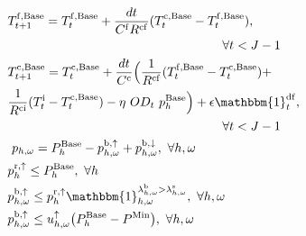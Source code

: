 {\begin{subequations}
\begin{align}
%
& T^{\rm{f},\text{Base}}_{t+1} = T^{\rm{f},\text{Base}}_{t} +   \frac{dt}{C^{\rm{f}}R^{\rm{cf}}} (T^{\rm{c},\text{Base}}_{t} - T^{\rm{f},\text{Base}}_{t}), \notag \\ & \hspace{6cm}\forall{t<J-1} \label{P2:state-space-3}                                                                                         \\
& T^{\rm{c},\text{Base}}_{t+1} = T^{\rm{c},\text{Base}}_t +   \frac{dt}{C^{\rm{c}}}\Bigl(\frac{1}{R^{\rm{cf}}} (T^{\rm{f},\text{Base}}_t - T^{\rm{c},\text{Base}}_t) + \notag \\ & \frac{1}{R^{\rm{ci}}} (T^{\rm{i}}_t - T^{\rm{c},\text{Base}}_t) - \eta  \  OD_t \ p_{h}^{\text{Base}} \Bigr) + \epsilon \mathbbm{1}^{\rm{df}}_{t}, \notag \\ & \hspace{6cm} \forall{t<J-1} \label{P2:state-space-4} \\
%
& \ p_{h,\omega} = P^{\rm{Base}}_{h} - p^{\rm{b}, \uparrow}_{h,\omega} + p^{\rm{b}, \downarrow}_{h,\omega}, \                                                                                                  \forall{h,\omega}                                                                             \label{power:6}                                                        \\
        \                                                                                             & p^{\rm{r}, \uparrow}_h \leq P^{\rm{Base}}_h,
        \                                                                                                                                                        \forall{h}                                                                                     \label{power:7}                                                                                                                                                                                                           \\
        \                                                                                             & p^{\rm{b}, \uparrow}_{h,\omega} \leq p^{\rm{r}, \uparrow}_h \mathbbm{1}_{h,\omega}^{\lambda^{\rm{b}}_{h,\omega} > \lambda^{\rm{s}}_{h,\omega}} , \                                                                            \forall{h,\omega}                                                                             \label{power:8}                                                   \\
        \                                                                                             & p^{\rm{b}, \uparrow}_{h,\omega} \leq u_{h,\omega}^{\uparrow} \big(P^{\rm{Base}}_{h} - P^{\rm{Min}}\big) , \                                                                                                       \forall{h,\omega}                                                                             \label{power:9}                                                  \\

\end{align}
\end{subequations}}
